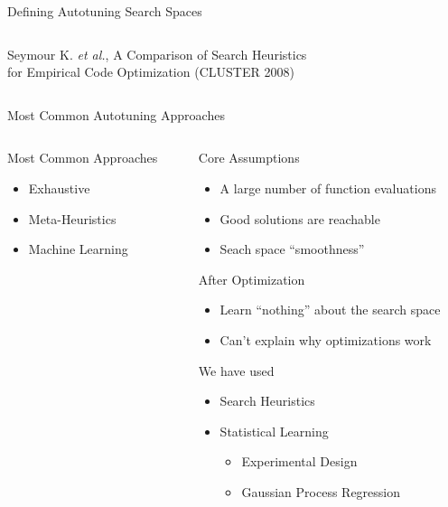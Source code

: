 \documentclass[10pt, compress, aspectratio=169, xcolor={table,usenames,dvipsnames}]{beamer}
\begin{document}
\begin{frame}[label={sec:org0a1038d}]{Defining Autotuning Search Spaces}
\begin{columns}
\begin{column}{0.6\columnwidth}
\begin{center}
\scriptsize{Seymour K. \emph{et al.}, A Comparison of Search Heuristics \\ for Empirical
  Code Optimization (CLUSTER 2008)}
\end{center}
\end{column}
\end{columns}
\end{frame}

\begin{frame}[label={sec:org1e550dc}]{Most Common Autotuning Approaches}
\begin{columns}
\begin{column}{0.5\columnwidth}
\begin{block}{Most Common Approaches}
\footnotesize
\begin{itemize}
\item \colorbox{red!25}{Exhaustive}
\item \colorbox{green!25}{Meta-Heuristics}
\item \colorbox{cyan!25}{Machine Learning}
\end{itemize}
\normalsize
\vspace{-.4cm}

\end{block}
\end{column}

\begin{column}{0.5\columnwidth}
\begin{block}{Core Assumptions}
\begin{itemize}
\item A large number of function evaluations
\item Good solutions are reachable
\item Seach space ``smoothness''
\end{itemize}
\begin{block}{After Optimization}
\begin{itemize}
\item \alert{Learn ``nothing''} about the search space
\item \alert{Can't explain} why optimizations work
\end{itemize}
\end{block}
\begin{block}{We have used}
\begin{itemize}
\item Search Heuristics
\item Statistical Learning
\begin{itemize}
\item Experimental Design
\item Gaussian Process Regression
\end{itemize}
\end{itemize}
\end{block}
\end{block}
\end{column}
\end{columns}
\end{frame}
\end{document}

